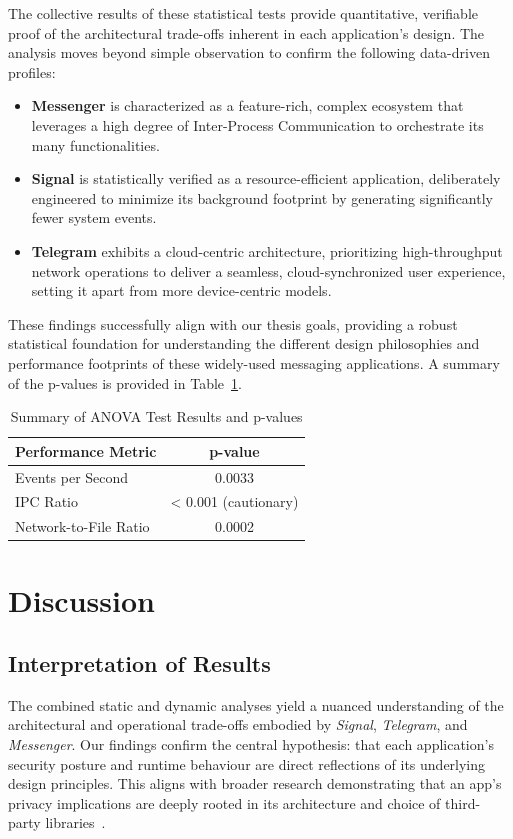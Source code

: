 \documentclass[a4paper,12pt]{report}
\begin{document}
The collective results of these statistical tests provide quantitative, verifiable proof of the architectural trade-offs inherent in each application's design. The analysis moves beyond simple observation to confirm the following data-driven profiles:
\begin{itemize}
    \item \textbf{Messenger} is characterized as a feature-rich, complex ecosystem that leverages a high degree of Inter-Process Communication to orchestrate its many functionalities.
    \item \textbf{Signal} is statistically verified as a resource-efficient application, deliberately engineered to minimize its background footprint by generating significantly fewer system events.
    \item \textbf{Telegram} exhibits a cloud-centric architecture, prioritizing high-throughput network operations to deliver a seamless, cloud-synchronized user experience, setting it apart from more device-centric models.
\end{itemize}
These findings successfully align with our thesis goals, providing a robust statistical foundation for understanding the different design philosophies and performance footprints of these widely-used messaging applications. A summary of the p-values is provided in Table~\ref{tab:comparative_tests_en}.

\begin{table}[H]
\centering
\caption{Summary of ANOVA Test Results and p-values}
\label{tab:comparative_tests_en}
\begin{tabular}{lc}
\toprule
\textbf{Performance Metric} & \textbf{p-value} \\
\midrule
Events per Second & 0.0033 \\
IPC Ratio & < 0.001 (cautionary) \\
Network-to-File Ratio & 0.0002 \\
\bottomrule
\end{tabular}
\end{table}


\chapter{Discussion}

\section{Interpretation of Results}

The combined static and dynamic analyses yield a nuanced understanding of the architectural and operational trade-offs embodied by \textit{Signal}, \textit{Telegram}, and \textit{Messenger}. Our findings confirm the central hypothesis: that each application's security posture and runtime behaviour are direct reflections of its underlying design principles. This aligns with broader research demonstrating that an app's privacy implications are deeply rooted in its architecture and choice of third-party libraries~\cite{ShenVervierStringhini2021}.
\end{document}
